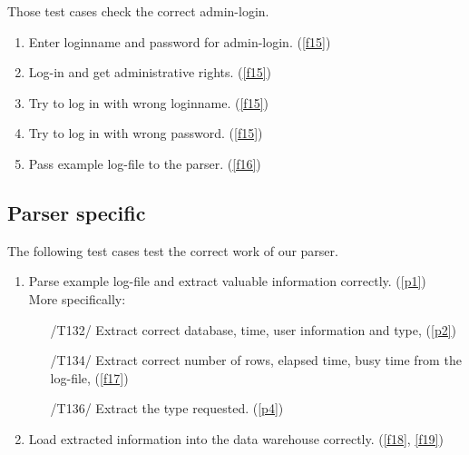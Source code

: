 Those test cases check the correct admin-login.

\begin{enumerate}[resume]

\item Enter loginname and password for admin-login. (\ref{f15})
\label{t17}

\item Log-in and get administrative rights. (\ref{f15})
\label{t18}

\item Try to log in with wrong loginname. (\ref{f15})
\label{t19}

\item Try to log in with wrong password. (\ref{f15})
\label{t20}

\item Pass example log-file to the parser. (\ref{f16})
\label{t21}


\end{enumerate}

\newpage
\subsection{Parser specific}

The following test cases test the correct work of our parser.

\begin{enumerate}[resume]

\item Parse example log-file and extract valuable information correctly. (\ref{p1})
	\\ More specifically: 
\label{t22}
  \begin{enumerate}

	\item[/T132/] Extract correct database, time, user information 
	and type, (\ref{p2})
\label{t23}

	\item[/T134/] Extract correct number of rows, elapsed time, 
	busy time from the log-file, (\ref{f17})
\label{t24}	
	
	\item[/T136/] Extract the type requested. (\ref{p4})
\label{t25}

  \end{enumerate}

\item Load extracted information into the data warehouse correctly. (\ref{f18}, \ref{f19})
\label{t26}

\end{enumerate}


